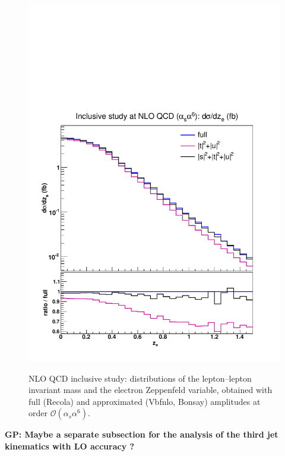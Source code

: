 \begin{figure}[hbt]
{\includegraphics[scale=0.35]{figures/scanfigures/zel_nlo.pdf}}
\caption{NLO QCD inclusive study: distributions of the lepton--lepton invariant mass and the electron Zeppenfeld variable, obtained with full ({\sc Recola}) and approximated ({\sc Vbfnlo, Bonsay}) amplitudes at order $\mathcal{O}(\alpha_s\alpha^6)$.} \label{fig:mjjdyjj_1d_3}
\end{figure}

{\bf GP: Maybe a separate subsection for the analysis of the third jet kinematics with LO accuracy ?}
